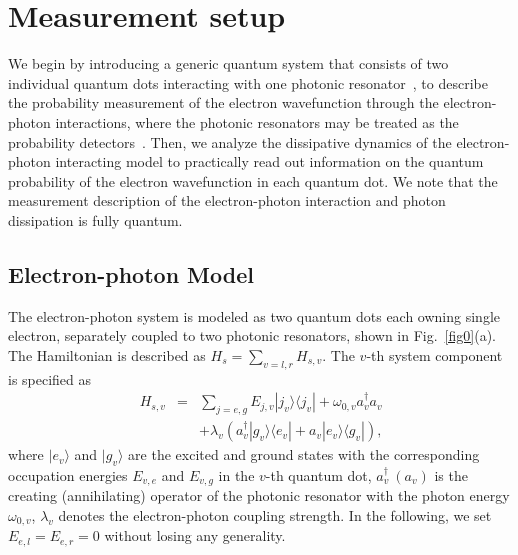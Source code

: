 \documentclass[twocolumn,showpacs,preprintnumbers,amsmath,amssymb]{revtex4}
\begin{document}
	
	\section{Measurement setup}
	We begin by introducing a generic quantum system that consists of two individual quantum dots interacting with one photonic resonator~\cite{syzhu1988pla,vva2012prl,pstegman2022acs}, to describe the probability measurement of the electron wavefunction through the electron-photon interactions, where the photonic resonators may be treated as the  probability detectors~\cite{rl2020prx,ea2021nature}. Then, we analyze the dissipative dynamics of the electron-photon interacting model to practically read out information on the quantum probability of the electron wavefunction in each quantum dot. We note that the measurement description of the electron-photon interaction and photon dissipation is fully quantum.
	
	\subsection{Electron-photon  Model}
	The electron-photon system is modeled as
	two  quantum dots each owning single electron, separately coupled to two photonic  resonators, shown in Fig.~\ref{fig0}(a).
	The Hamiltonian is described as $H_s=\sum_{v={l},{r}}H_{s,v}$.
	The $v$-th system component is specified as
	\begin{eqnarray}~\label{hs1}
		H_{s,v}&=&\sum_{j=e,g}E_{j,v}|j_{v}{\rangle}{\langle}j_v|+\omega_{0,v} a^\dagger_v a_v\\
		&&+\lambda_v(a^\dagger_v|g_{v}{\rangle}{\langle}e_v| +a_v |e_{v}{\rangle}{\langle}g_v|),\nonumber
	\end{eqnarray}
	where $|e_{v}{\rangle}$ and $|g_{v}{\rangle}$ are the excited and ground states
	with the corresponding occupation energies $E_{v,e}$ and $E_{v,g}$ in the $v$-th quantum dot,
	$a^\dag_v~(a_v)$ is the creating (annihilating) operator of the  photonic resonator with the photon energy $\omega_{0,v}$,
	$\lambda_v$ denotes the electron-photon coupling strength.
	In the following, we set $E_{e,{l}}=E_{e,{r}}=0$ without losing any generality.
	
\end{document}
